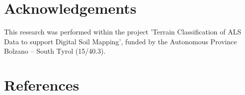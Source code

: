 \documentclass[preprint,12pt,authoryear]{elsarticle}
\begin{document}
\section*{Acknowledgements} This research was performed within the project 'Terrain Classification of ALS Data to support Digital Soil Mapping', funded by the Autonomous Province Bolzano -- South Tyrol (15/40.3).

\section*{References}

\end{document}
